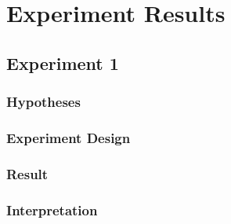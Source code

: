 \documentclass[./\jobname.tex]{subfiles}
\begin{document}
\chapter{Experiment Results}

\section {Experiment 1}

\subsection{Hypotheses}

\subsection{Experiment Design}

\subsection{Result}

\subsection{Interpretation}
\end{document}
